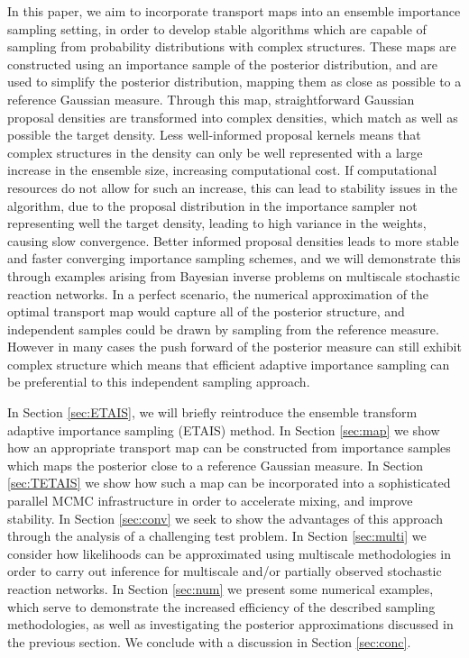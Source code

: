 \documentclass[final]{siamltex}
\newcommand{\edit}[1]{{\color{red} #1}}
\begin{document}

In this paper, we aim to incorporate transport maps into an ensemble
importance sampling setting, in order to develop stable algorithms which are
capable of sampling from probability distributions with complex
structures. These maps are constructed using an importance sample of
the posterior distribution, and are used to simplify the posterior
distribution, mapping them as close as possible to a reference
Gaussian measure. Through this map, straightforward Gaussian proposal
densities are transformed into complex densities, which match as well
as possible the target density. Less well-informed proposal kernels means that complex
structures in the density can only be well represented with a large
increase in the ensemble size, increasing computational cost. If
computational resources do not allow for such an increase, this can
lead to stability issues in the algorithm, due to the proposal
distribution in the importance sampler not representing well the
target density, leading to high variance in the weights, causing slow
convergence. Better informed proposal densities
leads to more stable and faster converging importance sampling
schemes, and we will demonstrate this through examples
arising from Bayesian inverse problems on multiscale stochastic
reaction networks. \edit{In a perfect scenario, the numerical
  approximation of the optimal transport map would capture all of the
  posterior structure, and independent samples could be drawn by
  sampling from the reference measure. However in many cases the push
  forward of the posterior measure can still exhibit complex structure
  which means that efficient adaptive importance sampling can be
  preferential to this independent sampling approach.}




In Section \ref{sec:ETAIS}, we will briefly reintroduce the ensemble
transform adaptive importance sampling (ETAIS) method. In Section \ref{sec:map} we show how an appropriate transport map can
be constructed from importance samples which maps the posterior close
to a reference Gaussian measure. In Section \ref{sec:TETAIS} we show
how such a map can be incorporated into a sophisticated parallel MCMC
infrastructure in order to accelerate mixing, and improve stability. In Section
\ref{sec:conv} we seek to show the advantages of this approach through
the analysis of a challenging test problem. In Section
\ref{sec:multi} we consider how likelihoods can be approximated using
 multiscale methodologies in order to carry out inference for
multiscale and/or partially observed stochastic reaction networks. In
Section \ref{sec:num} we present some numerical examples, which serve
to demonstrate the increased efficiency of the described sampling
methodologies, as well as investigating the posterior approximations
discussed in the previous section. We conclude with a discussion in
Section \ref{sec:conc}.
\end{document}
